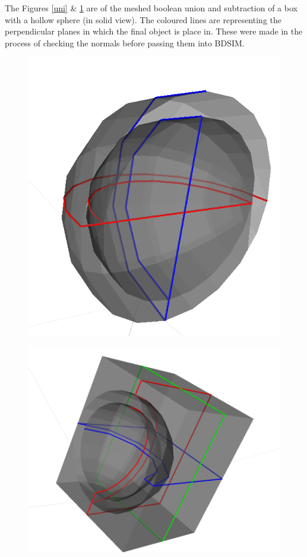 \documentclass[12pt,a4paper]{article}
\begin{document}
\noindent The Figures \ref{uni} \& \ref{sub} are of the meshed boolean union and subtraction of a box with a hollow sphere (in solid view). The coloured lines are representing the perpendicular planes in which the final object is place in. These were made in the process of checking the normals before passing them into BDSIM.
\\
\begin{figure}[h!]
\centering
\begin{minipage}{.4\textwidth}
  \centering
  \includegraphics[height=0.5\linewidth]{Images//Booleans/SphereUnion.png}
  \label{uni}
\end{minipage}%
\begin{minipage}{.4\textwidth}
  \centering
  \includegraphics[height=0.5\linewidth]{Images//Booleans//SphereSubtraction.png}
  \label{sub}
\end{minipage}%
\end{figure}
\end{document}
